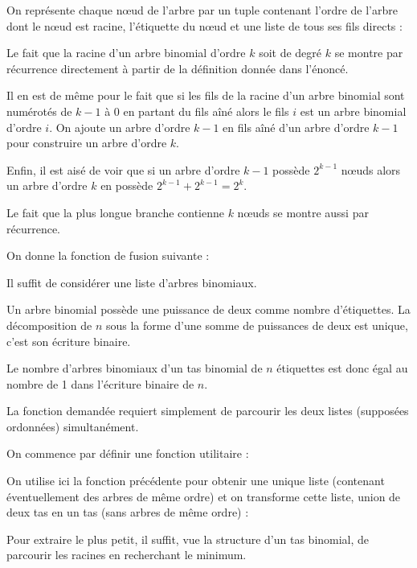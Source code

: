 \Q
On représente chaque nœud de l'arbre par un tuple contenant l'ordre de l'arbre dont le nœud est racine, l'étiquette du nœud et une liste de tous ses fils directs :



\Q
Le fait que la racine d'un arbre binomial d'ordre $k$ soit de degré $k$ se montre par récurrence directement à partir de la définition donnée dans l'énoncé.
\medskip

Il en est de même pour le fait que si les fils de la racine d'un arbre binomial sont numérotés de $k-1$ à $0$ en partant du fils aîné alors le fils $i$ est un arbre binomial d'ordre $i$. On ajoute un arbre d'ordre $k-1$ en fils aîné d'un arbre d'ordre $k-1$ pour construire un arbre d'ordre $k$.
\medskip

Enfin, il est aisé de voir que si un arbre d'ordre $k-1$ possède $2^{k-1}$ nœuds alors un arbre d'ordre $k$ en possède $2^{k-1}+2^{k-1}=2^k$.
\medskip

Le fait que la plus longue branche contienne $k$ nœuds se montre aussi par récurrence.

\Q
On donne la fonction de fusion suivante :



\Q
Il suffit de considérer une liste d'arbres binomiaux.
\medskip

Un arbre binomial possède une puissance de deux comme nombre d'étiquettes. La décomposition de $n$ sous la forme d'une somme de puissances de deux est unique, c'est son écriture binaire.
\medskip

Le nombre d'arbres binomiaux d'un tas binomial de $n$ étiquettes est donc égal au nombre de 1 dans l'écriture binaire de $n$.
\medskip

La fonction demandée requiert simplement de parcourir les deux listes (supposées ordonnées) simultanément.
\medskip

On commence par définir une fonction utilitaire :




\Q
On utilise ici la fonction précédente pour obtenir une unique liste (contenant éventuellement des arbres de même ordre) et on transforme cette liste, union de deux tas en un tas (sans arbres de même ordre) :



Pour extraire le plus petit, il suffit, vue la structure d'un tas binomial, de parcourir les racines en recherchant le minimum.
\medskip


